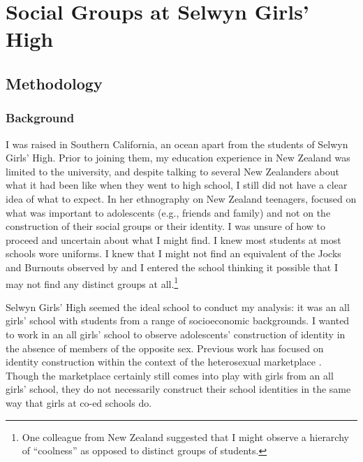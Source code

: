 \chapter{Social Groups at Selwyn Girls' High}
\label{ch:ethnography}
\date{}





\section{Methodology}

\subsection{Background}

I was raised in Southern California, an ocean apart from the students of Selwyn Girls' High.  Prior to joining them, my education experience in New Zealand was limited to the university, and despite talking to several New Zealanders about what it had been like when they went to high school, I still did not have a clear idea of what to expect.  In her ethnography on New Zealand teenagers,  focused on what was important to adolescents (e.g., friends and family) and not on the construction of their social groups or their identity.  I was unsure of how to proceed and uncertain about what I might find. I knew most students at most schools wore uniforms.  I knew that I might not find an equivalent of the Jocks and Burnouts observed by  and I entered the school thinking it possible that I may not find any distinct groups at all.\footnote{One colleague from New Zealand suggested that I might observe a hierarchy of ``coolness'' as opposed to distinct groups of students.}   


Selwyn Girls' High seemed the ideal school to conduct my analysis: it was an all girls' school with students from a range of socioeconomic backgrounds.  I wanted to work in an all girls' school to observe adolescents' construction of identity in the absence of members of the opposite sex.  Previous work has focused on identity construction within the context of the heterosexual marketplace \cite{eckert1996nailpolish}.  Though the marketplace certainly still comes into play with girls from an all girls' school, they do not necessarily construct their school identities in the same way that girls at co-ed schools do.  

